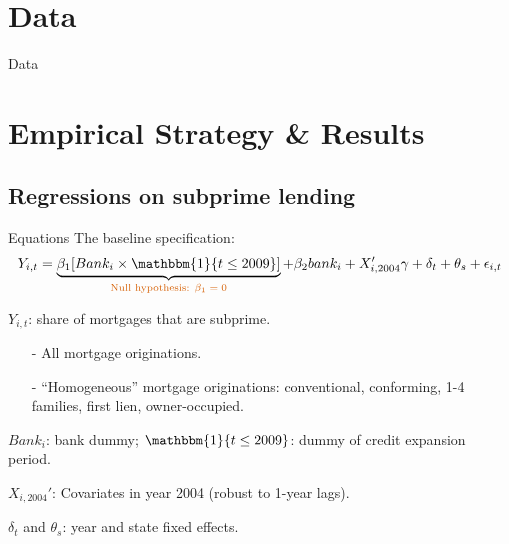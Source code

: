 \documentclass[notes,11pt, aspectratio=169]{beamer}
\newenvironment{wideitemize}{\itemize\addtolength{\itemsep}{10pt}}{\enditemize}  %
\begin{document}
\section{Data}

\begin{frame}{Data}
\end{frame}



\section{Empirical Strategy \& Results}

\subsection*{Regressions on subprime lending}

\begin{frame}{Equations}
The baseline specification: 
\begin{equation*}
    Y_{i,t} = \underbrace{\beta_1 [ Bank_i \times \mathbbm{1}\{ t \leq 2009 \} ]}_{\text{\textcolor{red}{Null hypothesis: $\beta_1=0$}}} + \beta_2 bank_i + X_{i, 2004}' \gamma + \delta_t + \theta_s + \epsilon_{i,t}
\end{equation*}

\begin{wideitemize}
    \item <1-> $Y_{i,t}$: share of mortgages that are subprime. 
    \begin{itemize}
        \item [-] All mortgage originations.
        \item [-] ``Homogeneous'' mortgage originations: conventional, conforming, 1-4 families, first lien, owner-occupied.
    \end{itemize}
    
    \item <2-> $Bank_i$: bank dummy; $\mathbbm{1}\{ t \leq 2009 \}$: dummy of credit expansion period. 
    
    \item <3> $X_{i, 2004}'$: Covariates in year 2004 (robust to 1-year lags).
    
    \item <3> $\delta_t$ and $\theta_s$: year and state fixed effects.
\end{wideitemize}
\end{frame}
\end{document}
